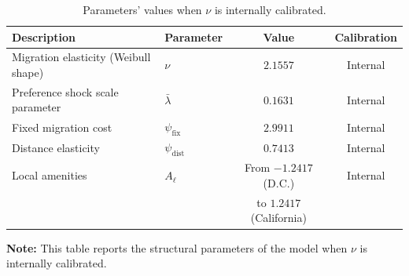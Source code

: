 \begin{table}[!htb]
    \centering
    \caption{Parameters' values when $\nu$ is internally calibrated.}
    \label{tab:small_nu_params}
    \begin{tabular}{llcc}
        \toprule
        \textbf{Description} & \textbf{Parameter} & \textbf{Value} & \textbf{Calibration} \\
        \midrule
        Migration elasticity (Weibull shape) & $\nu$ & $2.1557$ & Internal \\
        Preference shock scale parameter & $\bar{\lambda}$ & $0.1631$ & Internal \\
        Fixed migration cost & $\psi_{\text{fix}}$ & $2.9911$ & Internal \\
        Distance elasticity & $\psi_{\text{dist}}$ & $0.7413$ & Internal \\
        Local amenities & $A_\ell$ &  From $-1.2417$ (D.C.) & Internal \\
        & & to $1.2417$ (California) & \\
        \bottomrule
    \end{tabular}
    
    \vspace{0.2cm}
    \begin{minipage}{0.9\textwidth}
        \small \textbf{Note:} This table reports the structural parameters of the model when $\nu$ is internally calibrated.
    \end{minipage}
\end{table}